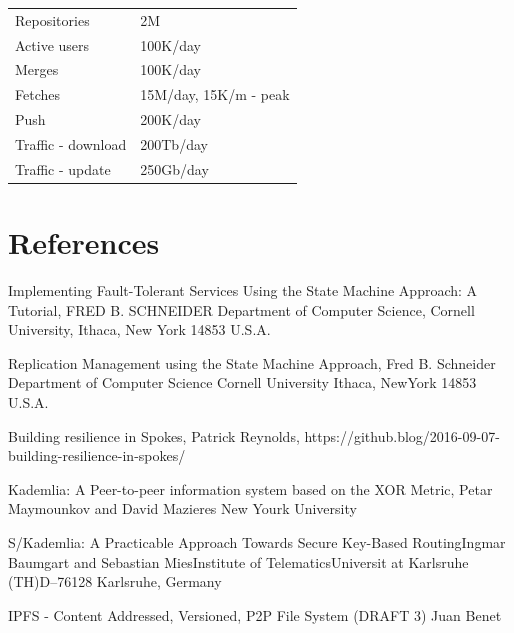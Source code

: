 \documentclass[12pt,oneside]{article}
\begin{document}
\begin{tabular}{ll}
  Repositories & 2M \\
  Active users & 100K/day \\
  Merges & 100K/day \\
  Fetches & 15M/day, 15K/m - peak \\
  Push & 200K/day \\
  Traffic - download & 200Tb/day \\
  Traffic - update & 250Gb/day \\
\end{tabular}

\section{References}
\label{ref:references}

Implementing Fault-Tolerant Services Using the State Machine Approach: A Tutorial, FRED B. SCHNEIDER Department of Computer Science, Cornell University, Ithaca, New York 14853 U.S.A.

Replication Management using the State Machine Approach, Fred B. Schneider Department of Computer Science Cornell University Ithaca, NewYork 14853 U.S.A.

Building resilience in Spokes, Patrick Reynolds, https://github.blog/2016-09-07-building-resilience-in-spokes/

Kademlia: A Peer-to-peer information system based on the XOR Metric, Petar Maymounkov and David Mazieres New Yourk University

S/Kademlia: A Practicable Approach Towards Secure Key-Based RoutingIngmar Baumgart and Sebastian MiesInstitute of TelematicsUniversit at Karlsruhe (TH)D–76128 Karlsruhe, Germany

IPFS - Content Addressed, Versioned, P2P File System (DRAFT 3) Juan Benet

\printbibliography%
\end{document}

